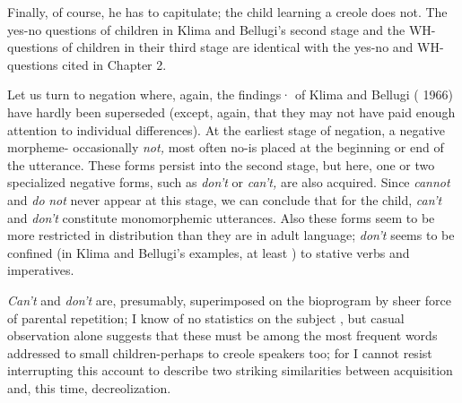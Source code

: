 Finally, of course, he has to capitulate; the child learning a creole does not. The yes-no questions of children in Klima and Bellugi's 
second stage and the WH-questions of children in their third stage are identical with the yes-no and WH-questions cited in Chapter 2.

Let us turn to negation where, again, the findings· of Klima and Bellugi ( 1966) have hardly been superseded (except, again, that they may not have paid enough attention to individual differences). At the earliest stage of negation, a negative morpheme- occasionally \textit{not,} most often no-is placed at the beginning or end of the utterance. These forms persist into the second stage, but here, one or two spe\-cialized negative forms, such as \textit{don't} or \textit{can't,} are also acquired. Since \textit{cannot} and \textit{do} \textit{not} never appear at this stage, we can conclude that for the child, \textit{can't} and \textit{don't} constitute monomorphemic utterances. Also these forms seem to be more restricted in distribution than they are in adult language; \textit{don't} seems to be confined (in Klima and Bellugi's examples, at least ) to stative verbs and imperatives.

\textit{Can't} and \textit{don't} are, presumably, superimposed on the bio\-program by sheer force of parental repetition; I know of no statistics on the subject , but casual observation alone suggests that these must be among the most frequent words addressed to small children-perhaps to creole speakers too; for I cannot resist interrupting this account to describe two striking similarities between acquisition and, this time, decreolization.

